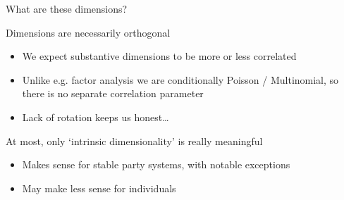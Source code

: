 \documentclass{hertieteaching}
\begin{document}
\begin{frame}{What are these dimensions?}

Dimensions are necessarily orthogonal
\begin{itemize}
  \item We expect substantive dimensions to be more or less correlated
  \item Unlike e.g. factor analysis we are conditionally Poisson / Multinomial, so there is no separate correlation parameter
  \item Lack of rotation keeps us honest\ldots
\end{itemize}

At most, only `intrinsic dimensionality' is really meaningful
\begin{itemize}
  \item Makes sense for stable party systems, with notable exceptions
  \item May make less sense for individuals \parencite{Broockman2016}
\end{itemize}

\end{frame}
\end{document}
